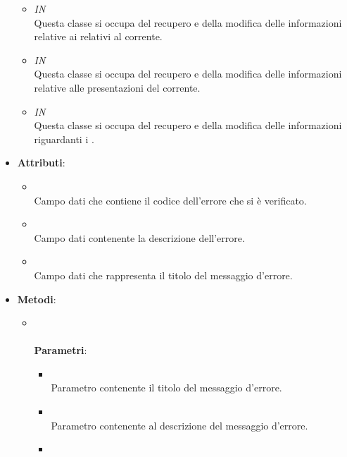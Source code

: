 \begin{itemize}
\begin{itemize}
\item \textit{IN} \hyperref[\nogloxy{Premi::Front-End::Services::PathService}]{}\\
Questa classe si occupa del recupero e della modifica delle informazioni relative ai  relativi al  corrente.
\item \textit{IN} \hyperref[\nogloxy{Premi::Front-End::Services::PresentationService}]{}\\
Questa classe si occupa del recupero e della modifica delle informazioni relative alle presentazioni del  corrente.
\item \textit{IN} \hyperref[\nogloxy{Premi::Front-End::Services::ProjectService}]{}\\
Questa classe si occupa del recupero e della modifica delle informazioni riguardanti i .
\end{itemize}
\item \textbf{Attributi}:
\begin{itemize}
\item {}
\\ Campo dati che contiene il codice dell'errore che si è verificato.
\item {}
\\ Campo dati contenente la descrizione dell'errore.
\item {}
\\ Campo dati che rappresenta il titolo del messaggio d'errore.
\end{itemize}
\item \textbf{Metodi}:
\begin{itemize}
\item {}
\\ \dpConstructor
\\ \textbf{Parametri}:
\begin{itemize}
\item {}
\\ Parametro contenente il titolo del messaggio d'errore.
\item {}
\\ Parametro contenente al descrizione del messaggio d'errore.
\item {}

\end{itemize}
\end{itemize}
\end{itemize}
